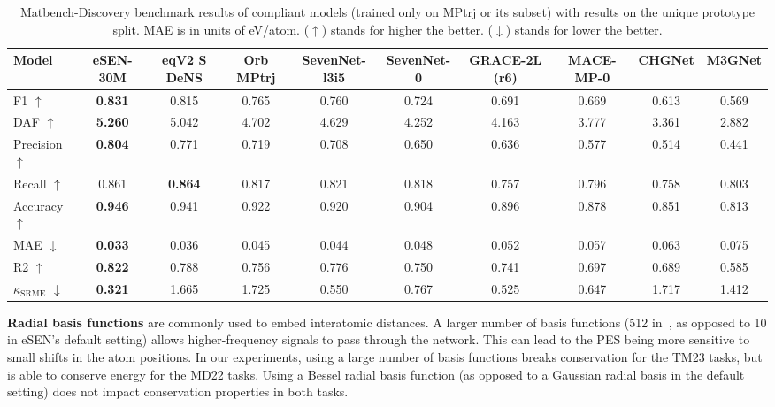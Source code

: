 \documentclass[twocolumn]{fairmeta}
\newcommand{\ourmodel}{eSEN}
\begin{document}
\begin{table*}[!htp]\centering 
\caption{
Matbench-Discovery benchmark results of compliant models (trained only on MPtrj or its subset) with results on the unique prototype split. MAE is in units of eV/atom. ($\uparrow$) stands for higher the better. ($\downarrow$) stands for lower the better.
\label{tab:mbd}
}
\begin{adjustbox}{width=\textwidth}
\begin{tabular}{l|ccccccccc}\toprule
Model &\ourmodel-30M &eqV2 S DeNS &Orb MPtrj &SevenNet-l3i5 &SevenNet-0 &GRACE-2L (r6) &MACE-MP-0 &CHGNet &M3GNet \\\midrule
F1 $\uparrow$ &\textbf{0.831} &0.815 &0.765 &0.760 &0.724 &0.691 &0.669 &0.613 &0.569 \\
DAF $\uparrow$ &\textbf{5.260} &5.042 &4.702 &4.629 &4.252 &4.163 &3.777 &3.361 &2.882 \\
Precision $\uparrow$ &\textbf{0.804} &0.771 &0.719 &0.708 &0.650 &0.636 &0.577 &0.514 &0.441 \\
Recall $\uparrow$ &0.861 &\textbf{0.864} &0.817 &0.821 &0.818 &0.757 &0.796 &0.758 &0.803 \\
Accuracy $\uparrow$ &\textbf{0.946} &0.941 &0.922 &0.920 &0.904 &0.896 &0.878 &0.851 &0.813 \\
\midrule
MAE $\downarrow$ &\textbf{0.033} &0.036 &0.045 &0.044 &0.048 &0.052 &0.057 &0.063 &0.075 \\
R2 $\uparrow$ &\textbf{0.822} &0.788 &0.756 &0.776 &0.750 &0.741 &0.697 &0.689 &0.585 \\
\midrule
$\kappa_{\mathrm{SRME}}$ $\downarrow$ &\textbf{0.321} &1.665 &1.725 &0.550 &0.767 &0.525 &0.647 &1.717 &1.412 \\
\bottomrule
\end{tabular}
\end{adjustbox}
\end{table*}

\textbf{Radial basis functions} are commonly used to embed interatomic distances\citep{bartok2013representing}. A larger number of basis functions (512 in~\citealt{passaro2023reducing}, as opposed to 10 in \ourmodel's default setting) allows higher-frequency signals to pass through the network. This can lead to the PES being more sensitive to small shifts in the atom positions. In our experiments, using a large number of basis functions breaks conservation for the TM23 tasks, but is able to conserve energy for the MD22 tasks. Using a Bessel radial basis function (as opposed to a Gaussian radial basis in the default setting) does not impact conservation properties in both tasks.
\end{document}
